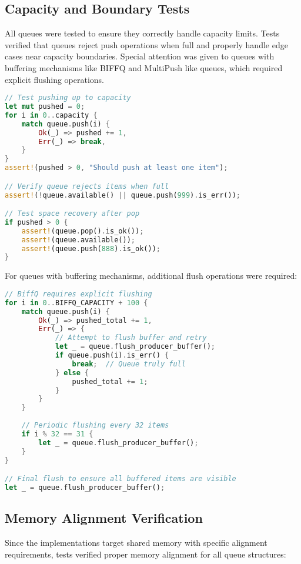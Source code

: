 \subsection{Capacity and Boundary Tests}
All queues were tested to ensure they correctly handle capacity limits. Tests verified that queues reject push operations when full and properly handle edge cases near capacity boundaries. Special attention was given to queues with buffering mechanisms like \ac{BIFFQ} and MultiPush like queues, which required explicit flushing operations.

\begin{lstlisting}[language=Rust, style=boxed, caption={Capacity limit test pattern}, label={lst:capacity-test}]
// Test pushing up to capacity
let mut pushed = 0;
for i in 0..capacity {
    match queue.push(i) {
        Ok(_) => pushed += 1,
        Err(_) => break,
    }
}
assert!(pushed > 0, "Should push at least one item");

// Verify queue rejects items when full
assert!(!queue.available() || queue.push(999).is_err());

// Test space recovery after pop
if pushed > 0 {
    assert!(queue.pop().is_ok());
    assert!(queue.available());
    assert!(queue.push(888).is_ok());
}
\end{lstlisting}

For queues with buffering mechanisms, additional flush operations were required:

\begin{lstlisting}[language=Rust, style=boxed, caption={Buffered queue capacity test}, label={lst:buffered-capacity-test}]
// BiffQ requires explicit flushing
for i in 0..BIFFQ_CAPACITY + 100 {
    match queue.push(i) {
        Ok(_) => pushed_total += 1,
        Err(_) => {
            // Attempt to flush buffer and retry
            let _ = queue.flush_producer_buffer();
            if queue.push(i).is_err() {
                break;  // Queue truly full
            } else {
                pushed_total += 1;
            }
        }
    }
    
    // Periodic flushing every 32 items
    if i % 32 == 31 {
        let _ = queue.flush_producer_buffer();
    }
}

// Final flush to ensure all buffered items are visible
let _ = queue.flush_producer_buffer();
\end{lstlisting}

\subsection{Memory Alignment Verification}
Since the implementations target shared memory with specific alignment requirements, tests verified proper memory alignment for all queue structures:

